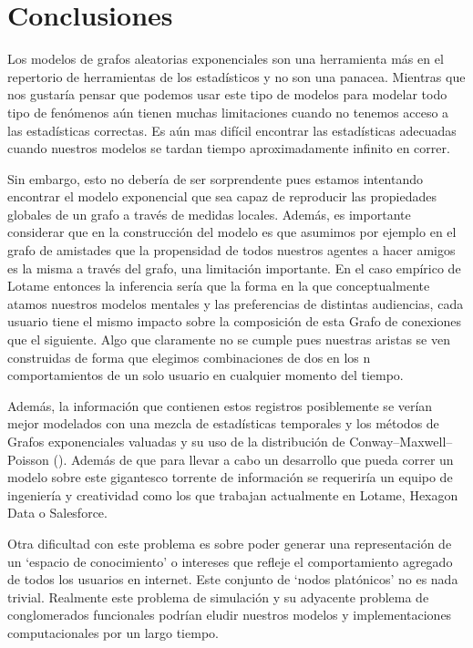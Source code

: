 \chapter{Conclusiones}
\label{ch:conclusions}

Los modelos de grafos aleatorias exponenciales son una herramienta más en el repertorio de herramientas de los estadísticos y no son una panacea. Mientras que nos gustaría pensar que podemos usar este tipo de modelos para modelar todo tipo de fenómenos aún tienen muchas limitaciones cuando no tenemos acceso a las estadísticas correctas. Es aún mas difícil encontrar las estadísticas adecuadas cuando nuestros modelos se tardan tiempo aproximadamente infinito en correr.

Sin embargo, esto no debería de ser sorprendente pues estamos intentando encontrar el modelo exponencial que sea capaz de reproducir las propiedades globales de un grafo a través de medidas locales. Además, es importante considerar que en la construcción del modelo es que asumimos por ejemplo en el grafo de amistades que la propensidad de todos nuestros agentes a hacer amigos es la misma a través del grafo, una limitación importante. En el caso empírico de Lotame entonces la inferencia sería que la forma en la que conceptualmente atamos nuestros modelos mentales y las preferencias de distintas audiencias, cada usuario tiene el mismo impacto sobre la composición de esta Grafo de conexiones que el siguiente. Algo que claramente no se cumple pues nuestras aristas se ven construidas de forma que elegimos combinaciones de dos en los n comportamientos de un solo usuario en cualquier momento del tiempo.

Además, la información que contienen estos registros posiblemente se verían mejor modelados con una mezcla de estadísticas temporales y los métodos de Grafos exponenciales valuadas y su uso de la distribución de Conway–Maxwell–Poisson (\cite{TERGMS}). Además de que para llevar a cabo un desarrollo que pueda correr un modelo sobre este gigantesco torrente de información se requeriría un equipo de ingeniería y creatividad como los que trabajan actualmente en Lotame, Hexagon Data o Salesforce. 

Otra dificultad con este problema es sobre poder generar una representación de un `espacio de conocimiento' o intereses que refleje el comportamiento agregado de todos los usuarios en internet. Este conjunto de `nodos platónicos' no es nada trivial. Realmente este problema de simulación y su adyacente problema de conglomerados funcionales podrían eludir nuestros modelos y implementaciones computacionales por un largo tiempo. 

